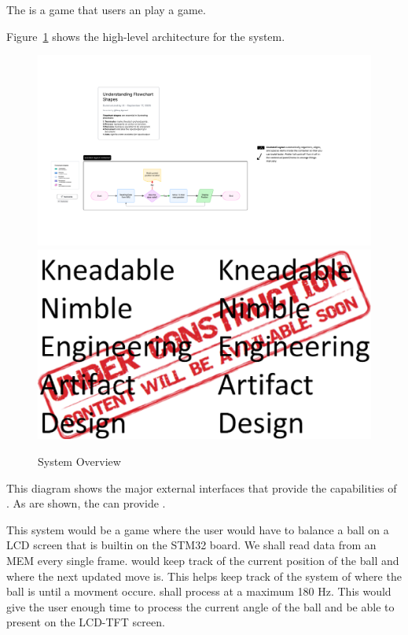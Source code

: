 
The \ThisSystem is a game that users an play a game.

Figure~\ref{fig:SystemOverview} shows the high-level architecture for the \ThisSys system. 
\begin{figure}[htbp]
	\centering
	\ifpdf
			\includegraphics[width=6in]{../zProjectWideData/images/Diagram.pdf}
		\else
			\includegraphics[width=6in]{../zProjectWideData/images/KNEAD_UnderConstruction_100dpi_6.5inchesWide.eps}
		\fi
		\caption{System Overview}
	\label{fig:SystemOverview}
\end{figure}
This diagram shows the major external interfaces that provide the capabilities of \ThisSys.
As are shown, the \ThisSys can provide \TBD.

This system would be a game where the user would have to balance a ball on a LCD screen that is builtin on the STM32 board. We shall read data from an MEM every single frame.
\ThisSys would keep track of the current position of the ball and where the next updated move is. This helps keep track of the system of where the ball is until a movment occure.
\ThisSys shall process at a maximum 180 Hz. This would give the user enough time to process the current angle of the ball and be able to present on the LCD-TFT screen.